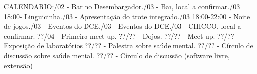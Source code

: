 \documentclass{ata-calico}
\begin{document}
CALENDARIO:/02 - Bar no Desembargador./03 - Bar, local a confirmar./03 18:00- Linguicinha./03 - Apresentação do trote integrado./03 18:00-22:00 - Noite de jogos./03 - Eventos do DCE./03 - Eventos do DCE./03 - CHICCO, local a confirmar.\newline
??/04 - Primeiro meet-up.\newline
??/?? - Dojos.\newline
??/?? - Meet-up.\newline
??/?? - Exposição de laboratórios\newline
??/?? - Palestra sobre saúde mental.
??/?? - Círculo de discussão sobre saúde mental.\newline
??/?? - Círculo de discussão (software livre, extensão)\newline

\end{document}
